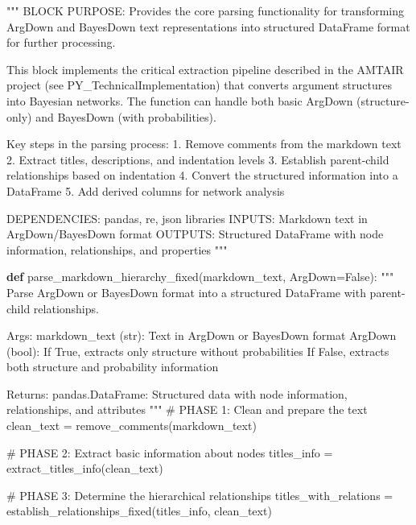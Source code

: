 \documentclass[
  11pt,
  letterpaper,
  openany]{book}
\newenvironment{Shaded}{\begin{snugshade}}{\end{snugshade}}
\newcommand{\CommentTok}[1]{\textcolor[rgb]{0.37,0.37,0.37}{#1}}
\newcommand{\KeywordTok}[1]{\textcolor[rgb]{0.00,0.23,0.31}{\textbf{#1}}}
\newcommand{\NormalTok}[1]{\textcolor[rgb]{0.00,0.23,0.31}{#1}}
\newcommand{\OperatorTok}[1]{\textcolor[rgb]{0.37,0.37,0.37}{#1}}
\newcommand{\VariableTok}[1]{\textcolor[rgb]{0.07,0.07,0.07}{#1}}
\begin{document}
\begin{landscape}
\begin{Shaded}
\begin{Highlighting}[]
\CommentTok{"""}
\CommentTok{BLOCK PURPOSE: Provides the core parsing functionality for transforming ArgDown}
\CommentTok{and BayesDown text representations into structured DataFrame format for further}
\CommentTok{processing.}

\CommentTok{This block implements the critical extraction pipeline described in the AMTAIR}
\CommentTok{project (see PY\_TechnicalImplementation) that converts argument structures}
\CommentTok{into Bayesian networks.}
\CommentTok{The function can handle both basic ArgDown (structure{-}only) and}
\CommentTok{BayesDown (with probabilities).}

\CommentTok{Key steps in the parsing process:}
\CommentTok{1. Remove comments from the markdown text}
\CommentTok{2. Extract titles, descriptions, and indentation levels}
\CommentTok{3. Establish parent{-}child relationships based on indentation}
\CommentTok{4. Convert the structured information into a DataFrame}
\CommentTok{5. Add derived columns for network analysis}

\CommentTok{DEPENDENCIES: pandas, re, json libraries}
\CommentTok{INPUTS: Markdown text in ArgDown/BayesDown format}
\CommentTok{OUTPUTS: Structured DataFrame with node information, relationships, and properties}
\CommentTok{"""}

\KeywordTok{def}\NormalTok{ parse\_markdown\_hierarchy\_fixed(markdown\_text, ArgDown}\OperatorTok{=}\VariableTok{False}\NormalTok{):}
    \CommentTok{"""}
\CommentTok{    Parse ArgDown or BayesDown format into a structured DataFrame with parent{-}child relationships.}

\CommentTok{    Args:}
\CommentTok{        markdown\_text (str): Text in ArgDown or BayesDown format}
\CommentTok{        ArgDown (bool): If True, extracts only structure without probabilities}
\CommentTok{                        If False, extracts both structure and probability information}

\CommentTok{    Returns:}
\CommentTok{        pandas.DataFrame: Structured data with node information, relationships, and attributes}
\CommentTok{    """}
    \CommentTok{\# PHASE 1: Clean and prepare the text}
\NormalTok{    clean\_text }\OperatorTok{=}\NormalTok{ remove\_comments(markdown\_text)}

    \CommentTok{\# PHASE 2: Extract basic information about nodes}
\NormalTok{    titles\_info }\OperatorTok{=}\NormalTok{ extract\_titles\_info(clean\_text)}

    \CommentTok{\# PHASE 3: Determine the hierarchical relationships}
\NormalTok{    titles\_with\_relations }\OperatorTok{=}\NormalTok{ establish\_relationships\_fixed(titles\_info, clean\_text)}


\end{Highlighting}
\end{Shaded}
\end{landscape}
\end{document}
